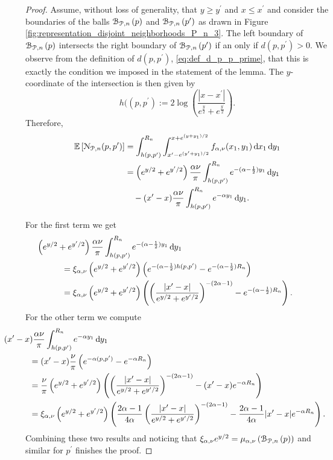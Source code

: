 \begin{proof}
Assume, without loss of generality, that $y \ge y^\prime$ and $x \le x^\prime$ and consider the boundaries of the balls ${\mathcal B}_{{\mathcal P},n}\left(p\right)$ and ${\mathcal B}_{{\mathcal P},n}\left(p^\prime\right)$ as drawn in Figure \ref{fig:representation_disjoint_neighborhoods_P_n_3}. The left boundary of ${\mathcal B}_{{\mathcal P},n}\left(p\right)$ intersects the right boundary of ${\mathcal B}_{{\mathcal P},n}\left(p^\prime\right)$ if an only if $d(p,p^\prime) > 0$. We observe from the definition of $d(p,p^\prime)$, \eqref{eq:def_d_p_p_prime}, that this is exactly the condition we imposed in the statement of the lemma. The $y$-coordinate of the intersection is then given by
\[
	h((p,p^\prime) := 2\log\left(\frac{|x - x^\prime|}{e^{\frac{y}{2}} + e^{\frac{y^\prime}{2}}}\right).
\]
Therefore,
\begin{align*}
	\mathbb{E}\left[{\mathcal N}_{{\mathcal P},n}(p,p^\prime)\right] 
	&= \int_{h(p,p^\prime)}^{R_n} \int_{x^\prime - e^{(y^\prime+y_1)/2}}^{x + e^{(y + y_1)/2}}
		f_{\alpha,\nu}(x_1,y_1) \operatorname{\mathrm{d}\hspace{-2pt}} x_1 \operatorname{\mathrm{d}\hspace{-2pt}} y_1\\
	&= \left(e^{y/2} + e^{y^\prime/2}\right)\frac{\alpha \nu}{\pi}\int_{h(p,p^\prime)}^{R_n} 
		e^{-(\alpha - \frac{1}{2})y_1} \operatorname{\mathrm{d}\hspace{-2pt}} y_1\\
	&\hspace{10pt}- (x^\prime - x) \frac{\alpha \nu}{\pi} \int_{h(p,p^\prime)}^{R_n} e^{-\alpha y_1} \operatorname{\mathrm{d}\hspace{-2pt}} y_1.
\end{align*}

For the first term we get
\begin{align*}
	&\hspace{-30pt}\left(e^{y/2} + e^{y^\prime/2}\right)\frac{\alpha \nu}{\pi}\int_{h(p,p^\prime)}^{R_n} 
		e^{-(\alpha - \frac{1}{2})y_1} \dd y_1\\
	&= \xi_{\alpha, \nu}\left(e^{y/2} + e^{y^\prime/2}\right)\left(
		e^{-(\alpha - \frac{1}{2})h(p,p^\prime)} - e^{-(\alpha - \frac{1}{2})R_n}\right)\\
	&= \xi_{\alpha, \nu}\left(e^{y/2} + e^{y^\prime/2}\right)\left(\left(\frac{|x^\prime - x|}{e^{y/2} + 	
		e^{y^\prime/2}}\right)^{-(2\alpha - 1)} - e^{-(\alpha - \frac{1}{2})R_n}\right).
\end{align*}
For the other term we compute
\begin{align*}
	&\hspace{-30pt}(x^\prime - x) \frac{\alpha \nu}{\pi} \int_{h(p,p^\prime)}^{R_n} e^{-\alpha y_1} \dd y_1\\
	&= (x^\prime - x) \frac{\nu}{\pi}\left(e^{-\alpha(p,p^\prime)} - e^{-\alpha R_n}\right)\\
	&= \frac{\nu}{\pi}\left(e^{y/2} + e^{y^\prime/2}\right) \left(
		\left(\frac{|x^\prime - x|}{e^{y/2} + e^{y^\prime/2}}\right)^{-(2\alpha - 1)}
		- (x^\prime - x)e^{-\alpha R_n}\right)\\
	&= \xi_{\alpha, \nu}\left(e^{y/2} + e^{y^\prime/2}\right)\left(
		\frac{2\alpha - 1}{4\alpha}\left(\frac{|x^\prime - x|}{e^{y/2} + e^{y^\prime/2}}\right)^{-(2\alpha - 1)}
		- \frac{2\alpha - 1}{4\alpha}|x^\prime - x|e^{-\alpha R_n}\right).
\end{align*}
Combining these two results and noticing that $\xi_{\alpha, \nu} e^{y/2} = \mu_{\alpha,\nu}\left({\mathcal B}_{{\mathcal P},n}\left(p\right)\right)$ and similar for $p^\prime$ finishes the proof.
\end{proof} 

